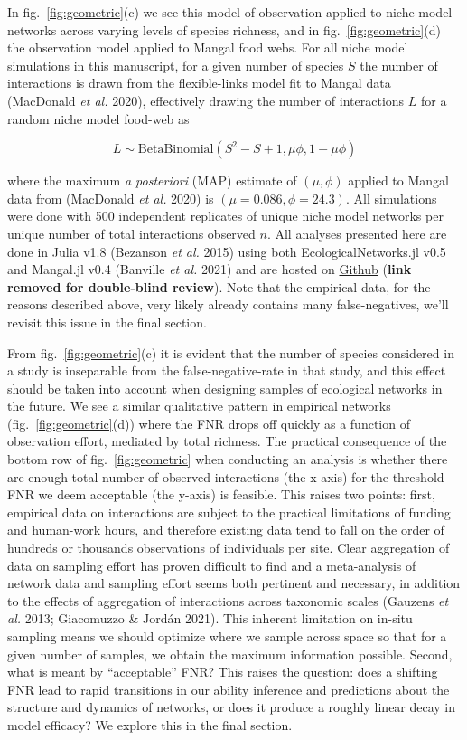 \documentclass[10pt,oneside]{article}
\begin{document}
In fig.~\ref{fig:geometric}(c) we see this model of observation applied
to niche model networks across varying levels of species richness, and
in fig.~\ref{fig:geometric}(d) the observation model applied to Mangal
food webs. For all niche model simulations in this manuscript, for a
given number of species \(S\) the number of interactions is drawn from
the flexible-links model fit to Mangal data (MacDonald \emph{et al.}
2020), effectively drawing the number of interactions \(L\) for a random
niche model food-web as

\[L \sim  \text{BetaBinomial}(S^2-S+1,\mu\phi, 1-\mu\phi)\]

where the maximum \emph{a posteriori} (MAP) estimate of \((\mu, \phi)\)
applied to Mangal data from (MacDonald \emph{et al.} 2020) is
\((\mu=0.086, \phi=24.3)\). All simulations were done with 500
independent replicates of unique niche model networks per unique number
of total interactions observed \(n\). All analyses presented here are
done in Julia v1.8 (Bezanson \emph{et al.} 2015) using both
EcologicalNetworks.jl v0.5 and Mangal.jl v0.4 (Banville \emph{et al.}
2021) and are hosted on \href{}{Github} (\textbf{link removed for
double-blind review}). Note that the empirical data, for the reasons
described above, very likely already contains many false-negatives,
we'll revisit this issue in the final section.

From fig.~\ref{fig:geometric}(c) it is evident that the number of
species considered in a study is inseparable from the
false-negative-rate in that study, and this effect should be taken into
account when designing samples of ecological networks in the future. We
see a similar qualitative pattern in empirical networks
(fig.~\ref{fig:geometric}(d)) where the FNR drops off quickly as a
function of observation effort, mediated by total richness. The
practical consequence of the bottom row of fig.~\ref{fig:geometric} when
conducting an analysis is whether there are enough total number of
observed interactions (the x-axis) for the threshold FNR we deem
acceptable (the y-axis) is feasible. This raises two points: first,
empirical data on interactions are subject to the practical limitations
of funding and human-work hours, and therefore existing data tend to
fall on the order of hundreds or thousands observations of individuals
per site. Clear aggregation of data on sampling effort has proven
difficult to find and a meta-analysis of network data and sampling
effort seems both pertinent and necessary, in addition to the effects of
aggregation of interactions across taxonomic scales (Gauzens \emph{et
al.} 2013; Giacomuzzo \& Jordán 2021). This inherent limitation on
in-situ sampling means we should optimize where we sample across space
so that for a given number of samples, we obtain the maximum information
possible. Second, what is meant by ``acceptable'' FNR? This raises the
question: does a shifting FNR lead to rapid transitions in our ability
inference and predictions about the structure and dynamics of networks,
or does it produce a roughly linear decay in model efficacy? We explore
this in the final section.
\end{document}
